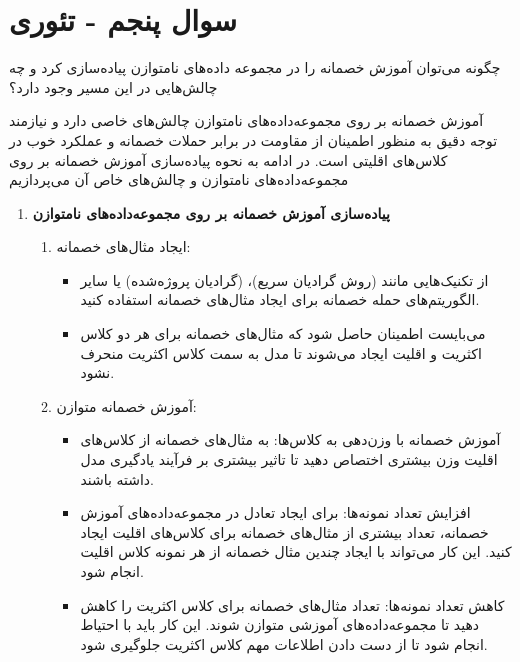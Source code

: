 \section{سوال پنجم - تئوری}
چگونه می‌توان آموزش خصمانه را در مجموعه داده‌های نامتوازن پیاده‌سازی کرد و چه چالش‌هایی در این مسیر وجود دارد؟





\begin{qsolve}
آموزش خصمانه بر روی مجموعه‌داده‌های نامتوازن چالش‌های خاصی دارد و نیازمند توجه دقیق به منظور اطمینان از مقاومت در برابر حملات خصمانه و عملکرد خوب در کلاس‌های اقلیتی است. در ادامه به نحوه پیاده‌سازی آموزش خصمانه بر روی مجموعه‌داده‌های نامتوازن و چالش‌های خاص آن می‌پردازیم


\begin{enumerate}
	\item \textbf{پیاده‌سازی آموزش خصمانه بر روی مجموعه‌داده‌های نامتوازن}
	\begin{enumerate}
		\item ایجاد مثال‌های خصمانه:
		\begin{itemize}
			\item 
از تکنیک‌هایی مانند \lrP (روش گرادیان سریع)،  (گرادیان پروژه‌شده) یا سایر الگوریتم‌های حمله خصمانه برای ایجاد مثال‌های خصمانه استفاده کنید.

			\item 
می‌بایست اطمینان حاصل شود که مثال‌های خصمانه برای هر دو کلاس اکثریت و اقلیت ایجاد می‌شوند تا مدل به سمت کلاس اکثریت منحرف نشود.
		\end{itemize}
		
		
		\item آموزش خصمانه متوازن:
		\begin{itemize}
			\item 
آموزش خصمانه با وزن‌دهی به کلاس‌ها: به مثال‌های خصمانه از کلاس‌های اقلیت وزن بیشتری اختصاص دهید تا تاثیر بیشتری بر فرآیند یادگیری مدل داشته باشند.


			\item 
افزایش تعداد نمونه‌ها: برای ایجاد تعادل در مجموعه‌داده‌های آموزش خصمانه، تعداد بیشتری از مثال‌های خصمانه برای کلاس‌های اقلیت ایجاد کنید. این کار می‌تواند با ایجاد چندین مثال خصمانه از هر نمونه کلاس اقلیت انجام شود.

	
			\item 
کاهش تعداد نمونه‌ها: تعداد مثال‌های خصمانه برای کلاس اکثریت را کاهش دهید تا مجموعه‌داده‌های آموزشی متوازن شوند. این کار باید با احتیاط انجام شود تا از دست دادن اطلاعات مهم کلاس اکثریت جلوگیری شود.
		\end{itemize}
		

\end{enumerate}
\end{enumerate}
\end{qsolve}
